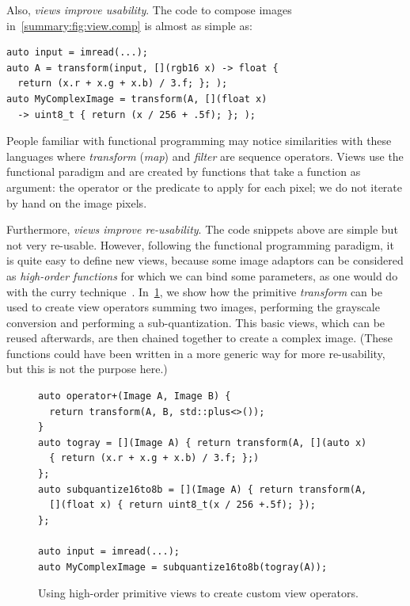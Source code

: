 Also, \emph{views improve usability}. The code to compose images in~\cref{summary:fig:view.comp} is almost as simple as:

\begin{verbatim}
auto input = imread(...);
auto A = transform(input, [](rgb16 x) -> float {
  return (x.r + x.g + x.b) / 3.f; }; );
auto MyComplexImage = transform(A, [](float x)
  -> uint8_t { return (x / 256 + .5f); }; );
\end{verbatim}

People familiar with functional programming may notice similarities with these languages where \emph{transform}
(\emph{map}) and \emph{filter} are sequence operators. Views use the functional paradigm and are created by functions
that take a function as argument: the operator or the predicate to apply for each pixel; we do not iterate by hand on
the image pixels.

Furthermore, \emph{views improve re-usability}. The code snippets above are simple but not very re-usable. However,
following the functional programming paradigm, it is quite easy to define new views, because some image adaptors can be
considered as \emph{high-order functions} for which we can bind some parameters, as one would do with the curry
technique~\parencite{hanus.1995.curry}. In~\cref{summary:fig:view.highorder}, we show how the primitive \emph{transform}
can be used to create view operators summing two images, performing the grayscale conversion and performing a
sub-quantization. This basic views, which can be reused afterwards, are then chained together to create a complex image.
(These functions could have been written in a more generic way for more re-usability, but this is not the purpose here.)

\begin{figure}
  \begin{verbatim}
auto operator+(Image A, Image B) {
  return transform(A, B, std::plus<>());
}
auto togray = [](Image A) { return transform(A, [](auto x)
  { return (x.r + x.g + x.b) / 3.f; };)
};
auto subquantize16to8b = [](Image A) { return transform(A,
  [](float x) { return uint8_t(x / 256 +.5f); });
};

auto input = imread(...);
auto MyComplexImage = subquantize16to8b(togray(A));
  \end{verbatim}

  \caption[]{Using high-order primitive views to create custom view operators.}
  \label{summary:fig:view.highorder}
\end{figure}

